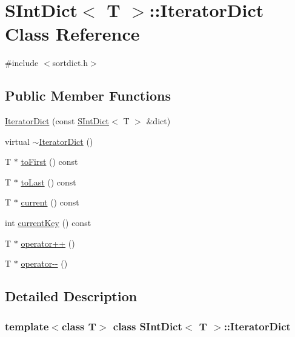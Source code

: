 \hypertarget{class_s_int_dict_1_1_iterator_dict}{}\section{S\+Int\+Dict$<$ T $>$\+::Iterator\+Dict Class Reference}
\label{class_s_int_dict_1_1_iterator_dict}


{\ttfamily \#include $<$sortdict.\+h$>$}

\subsection*{Public Member Functions}
\begin{DoxyCompactItemize}
\item 
\mbox{\hyperlink{class_s_int_dict_1_1_iterator_dict_a6bbd7ab69b3df8c5c1a2bc2e4efea152}{Iterator\+Dict}} (const \mbox{\hyperlink{class_s_int_dict}{S\+Int\+Dict}}$<$ T $>$ \&dict)
\item 
virtual \mbox{\hyperlink{class_s_int_dict_1_1_iterator_dict_af37503cbd054f367959b0343bf172fd9}{$\sim$\+Iterator\+Dict}} ()
\item 
T $\ast$ \mbox{\hyperlink{class_s_int_dict_1_1_iterator_dict_a83a54bca4490af7eae48fedabde992fa}{to\+First}} () const
\item 
T $\ast$ \mbox{\hyperlink{class_s_int_dict_1_1_iterator_dict_a767f9665e1ede5ff95c5890c499620bc}{to\+Last}} () const
\item 
T $\ast$ \mbox{\hyperlink{class_s_int_dict_1_1_iterator_dict_a7c7b9ac3972dcdb99517abd8d5bfa839}{current}} () const
\item 
int \mbox{\hyperlink{class_s_int_dict_1_1_iterator_dict_a4d63d7e400817d92017a5a31a11ae433}{current\+Key}} () const
\item 
T $\ast$ \mbox{\hyperlink{class_s_int_dict_1_1_iterator_dict_a4f7cc0bad139d87c2730964f89628e2d}{operator++}} ()
\item 
T $\ast$ \mbox{\hyperlink{class_s_int_dict_1_1_iterator_dict_aa68b38ab392a260b9a5b2c8b06f1b17b}{operator-\/-\/}} ()
\end{DoxyCompactItemize}


\subsection{Detailed Description}
\subsubsection*{template$<$class T$>$\newline
class S\+Int\+Dict$<$ T $>$\+::\+Iterator\+Dict}

